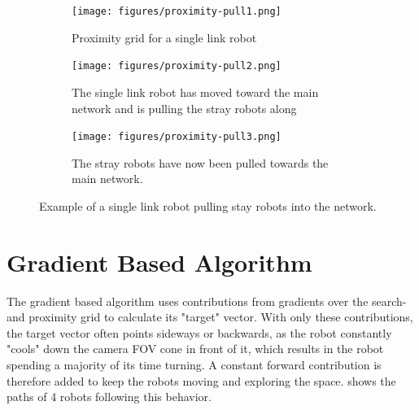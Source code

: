 \begin{figure}[h]
    \begin{center}
        \begin{subfigure}[b]{0.31\textwidth}
            \centering
            \texttt{[image: figures/proximity-pull1.png]}
            \caption{Proximity grid for a {\color{red} single link} robot}
            \label{fig:proximity-pull1}
        \end{subfigure}
        \begin{subfigure}[b]{0.31\textwidth}
            \centering
            \texttt{[image: figures/proximity-pull2.png]}
            \caption{The single link robot has moved toward the main network and is pulling the stray robots along}
            \label{fig:proximity-pull2}
        \end{subfigure}
        \begin{subfigure}[b]{0.31\textwidth}
            \centering
            \texttt{[image: figures/proximity-pull3.png]}
            \caption{The stray robots have now been pulled towards the main network.}
            \label{fig:proximity-pull3}
        \end{subfigure}
    \end{center}
    \caption{Example of a {\color{red} single link} robot pulling stay robots into the network.}\label{fig:proximity-pull}
\end{figure}


\section{Gradient Based Algorithm}
The gradient based algorithm uses contributions from gradients over the search{\color{red}-} and proximity grid to calculate its "target" vector. With only these contributions, the target vector often points sideways or backwards, as the robot constantly "cools" down the camera FOV cone in front of it, which results in the robot spending a majority of its time turning. A constant forward contribution is therefore added to keep the robots moving and exploring the space.  shows the paths of 4 robots following this behavior.



